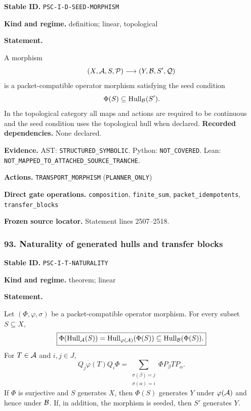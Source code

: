 \documentclass[a4paper,11pt]{article}
\newcommand{\Hull}{\operatorname{Hull}}\newcommand{\srank}{\operatorname{srank}}\newcommand{\psrank}{\operatorname{psrank}}\newcommand{\End}{\operatorname{End}}\newcommand{\Hom}{\operatorname{Hom}}\newcommand{\im}{\operatorname{im}}\newcommand{\Ker}{\operatorname{Ker}}\newcommand{\Jac}{\operatorname{Jac}}\newcommand{\Irr}{\operatorname{Irr}}\newcommand{\Span}{\operatorname{span}}\newcommand{\alg}{\operatorname{alg}}\newcommand{\Reach}{\operatorname{Reach}}\newcommand{\Supp}{\operatorname{Supp}}\newcommand{\id}{\mathrm{id}}\newcommand{\cl}[1]{\overline{#1}}
\newcommand{\field}[2]{\noindent\textbf{#1.} #2\par}
\begin{document}
\label{rec:PSC-I-D-SEED-MORPHISM}
\field{Stable ID}{\nolinkurl{PSC-I-D-SEED-MORPHISM}}
\field{Kind and regime}{definition; linear, topological}
\textbf{Statement.}\par
A morphism
\[
(X,\mathcal A,S,\mathcal P)\longrightarrow(Y,\mathcal B,S',\mathcal Q)
\]
is a packet-compatible operator morphism satisfying the seed condition
\[
\Phi(S)\subseteq\Hull_\B(S').
\]
In the topological category all maps and actions are required to be continuous and the seed condition uses the topological hull when declared.
\field{Recorded dependencies}{None declared.}
\field{Evidence}{AST: \nolinkurl{STRUCTURED_SYMBOLIC}. Python: \nolinkurl{NOT_COVERED}. Lean: \nolinkurl{NOT_MAPPED_TO_ATTACHED_SOURCE_TRANCHE}.}
\field{Actions}{\nolinkurl{TRANSPORT_MORPHISM} (\nolinkurl{PLANNER_ONLY})}
\field{Direct gate operations}{\nolinkurl{composition}, \nolinkurl{finite_sum}, \nolinkurl{packet_idempotents}, \nolinkurl{transfer_blocks}}
\field{Frozen source locator}{Statement lines 2507--2518.}
\subsubsection*{93. Naturality of generated hulls and transfer blocks}
\label{rec:PSC-I-T-NATURALITY}
\field{Stable ID}{\nolinkurl{PSC-I-T-NATURALITY}}
\field{Kind and regime}{theorem; linear}
\textbf{Statement.}\par
Let $(\Phi,\varphi,\sigma)$ be a packet-compatible operator morphism.  For every subset $S\subseteq X$,
\[
\boxed{
\Phi(\Hull_\A(S))
=
\Hull_{\varphi(\A)}(\Phi(S))
\subseteq
\Hull_\B(\Phi(S)).
}
\]
For $T\in\mathcal A$ and $i,j\in J$,
\[
\boxed{
Q_j\varphi(T)Q_i\Phi
=
\sum_{\substack{\sigma(\beta)=j\\\sigma(\alpha)=i}}
\Phi P_\beta TP_\alpha.
}
\]
If $\Phi$ is surjective and $S$ generates $X$, then $\Phi(S)$ generates $Y$ under $\varphi(\mathcal A)$ and hence under $\mathcal B$.  If, in addition, the morphism is seeded, then $S'$ generates $Y$.
\end{document}
